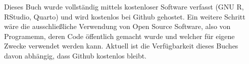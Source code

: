 \documentclass[
  letterpaper,
  DIV=11,
  numbers=noendperiod]{scrreprt}
\begin{document}
\begin{tcolorbox}[enhanced jigsaw, title=\textcolor{quarto-callout-note-color}{\faInfo}\hspace{0.5em}{Die Kosten eines ``Offenen Buches''}, colbacktitle=quarto-callout-note-color!10!white, rightrule=.15mm, titlerule=0mm, left=2mm, bottomrule=.15mm, arc=.35mm, leftrule=.75mm, toprule=.15mm, opacityback=0, breakable, bottomtitle=1mm, colframe=quarto-callout-note-color-frame, toptitle=1mm, opacitybacktitle=0.6, coltitle=black, colback=white]

Dieses Buch wurde vollständig mittels kostenloser Software verfasst (GNU
R, RStudio, Quarto) und wird kostenlos bei Github gehostet. Ein weitere
Schritt wäre die ausschließliche Verwendung von Open Source Software,
also von Programemn, deren Code öffentlich gemacht wurde und welcher für
eigene Zwecke verwendet werden kann. Aktuell ist die Verfügbarkeit
dieses Buches davon abhängig, dass Github kostenlos bleibt.

\end{tcolorbox}
\end{document}
